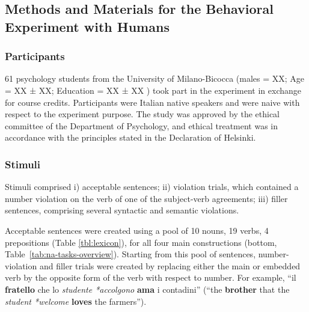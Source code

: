 \subsection{Methods and Materials for the Behavioral Experiment with Humans}
\subsubsection{Participants}
61 psychology students from the University of Milano-Bicocca (males = XX; Age = XX ± XX; Education = XX ± XX ) took part in the experiment in exchange for course credits. 
Participants were Italian native speakers and were naive with respect to the experiment purpose. 
The study was approved by the ethical committee of the Department of Psychology, and ethical treatment was in accordance with the principles stated in the Declaration of Helsinki.

\subsubsection{Stimuli}
Stimuli comprised i) acceptable sentences; ii) violation trials, which contained a number violation on the verb of one of the subject-verb agreements; iii) filler sentences, comprising several syntactic and semantic violations. 

Acceptable sentences were created using a pool of 10 nouns, 19 verbs, 4 prepositions (Table \ref{tbl:lexicon}), for all four main constructions (bottom, Table~\ref{tab:na-tasks-overview}). Starting from this pool of sentences, number-violation and filler trials were created by replacing either the main or embedded verb by the opposite form of the verb with respect to number. For example, ``il \textbf{fratello} che lo \emph{studente *accolgono} \textbf{ama} i contadini'' (``the \textbf{brother} that the \emph{student *welcome} \textbf{loves} the farmers'').

